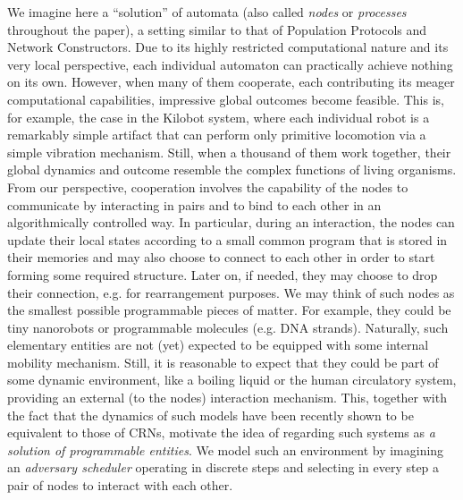 \documentclass[oribibl, 11pt]{llncs}
\begin{document}
We imagine here a ``solution'' of automata (also called \emph{nodes} or \emph{processes} throughout the paper), a setting similar to that of Population Protocols and Network Constructors. Due to its highly restricted computational nature and its very local perspective, each individual automaton can practically achieve nothing on its own. However, when many of them cooperate, each contributing its meager computational capabilities, impressive global outcomes become feasible. This is, for example, the case in the Kilobot system, where each individual robot is a remarkably simple artifact that can perform only primitive locomotion via a simple vibration mechanism. Still, when a thousand of them work together, their global dynamics and outcome resemble the complex functions of living organisms. From our perspective, cooperation  involves the capability of the nodes to communicate by interacting in pairs and to bind to each other in an algorithmically controlled way. In particular, during an interaction, the nodes can update their local states according to a small common program that is stored in their memories and may also choose to connect to each other in order to start forming some required structure. Later on, if needed, they may choose to drop their connection, e.g. for rearrangement purposes. We may think of such nodes as the smallest possible programmable pieces of matter. For example, they could be tiny nanorobots or programmable molecules (e.g. DNA strands). Naturally, such elementary entities are not (yet) expected to be equipped with some internal mobility mechanism. Still, it is reasonable to expect that they could be part of some dynamic environment, like a boiling liquid or the human circulatory system, providing an external (to the nodes) interaction mechanism. This, together with the fact that the dynamics of such models have been recently shown to be equivalent to those of CRNs, motivate the idea of regarding such systems as \emph{a solution of programmable entities}. We model such an environment by imagining an \emph{adversary scheduler} operating in discrete steps and selecting in every step a pair of nodes to interact with each other.
\end{document}
